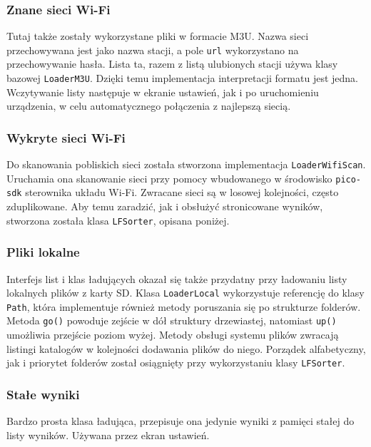 \documentclass[polish]{aghengthesis}
\begin{document}
			\subsubsection{Znane sieci Wi-Fi}
				Tutaj także zostały wykorzystane pliki w formacie M3U. Nazwa sieci przechowywana jest jako nazwa stacji, a pole \lstinline|url| wykorzystano na przechowywanie hasła. Lista ta, razem z listą ulubionych stacji używa klasy bazowej \lstinline|LoaderM3U|. Dzięki temu implementacja interpretacji formatu jest jedna. Wczytywanie listy następuje w ekranie ustawień, jak i po uruchomieniu urządzenia, w celu automatycznego połączenia z najlepszą siecią.
				
			\subsubsection{Wykryte sieci Wi-Fi}
				Do skanowania pobliskich sieci została stworzona implementacja \lstinline|LoaderWifiScan|. Uruchamia ona skanowanie sieci przy pomocy wbudowanego w środowisko \lstinline|pico-sdk| sterownika układu Wi-Fi. Zwracane sieci są w losowej kolejności, często zduplikowane. Aby temu zaradzić, jak i obsłużyć stronicowane wyników, stworzona została klasa \lstinline|LFSorter|, opisana poniżej.
				
			\subsubsection{Pliki lokalne}
				Interfejs list i klas ładujących okazał się także przydatny przy ładowaniu listy lokalnych plików z karty SD. Klasa \lstinline|LoaderLocal| wykorzystuje referencję do klasy \lstinline|Path|, która implementuje również metody poruszania się po strukturze folderów. Metoda \lstinline|go()| powoduje zejście w dół struktury drzewiastej, natomiast \lstinline|up()| umożliwia przejście poziom wyżej. Metody obsługi systemu plików zwracają listingi katalogów w kolejności dodawania plików do niego. Porządek alfabetyczny, jak i priorytet folderów został osiągnięty przy wykorzystaniu klasy \lstinline|LFSorter|.
				
			\subsubsection{Stałe wyniki}
				Bardzo prosta klasa ładująca, przepisuje ona jedynie wyniki z pamięci stałej do listy wyników. Używana przez ekran ustawień.
				
\end{document}
